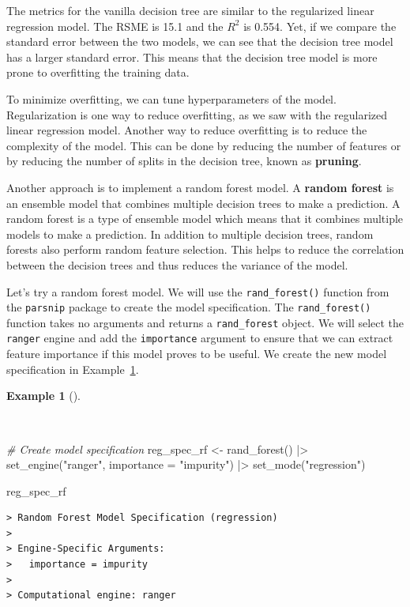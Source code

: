 \documentclass[
  letterpaper,
  DIV=11,
  numbers=noendperiod]{scrreprt}
\newenvironment{Shaded}{\begin{snugshade}}{\end{snugshade}}
\newcommand{\AttributeTok}[1]{\textcolor[rgb]{0.00,0.00,0.00}{#1}}
\newcommand{\CommentTok}[1]{\textcolor[rgb]{0.00,0.00,0.00}{\textit{#1}}}
\newcommand{\FunctionTok}[1]{\textcolor[rgb]{0.00,0.00,0.00}{#1}}
\newcommand{\NormalTok}[1]{\textcolor[rgb]{0.00,0.00,0.00}{#1}}
\newcommand{\OtherTok}[1]{\textcolor[rgb]{0.00,0.00,0.00}{#1}}
\newcommand{\SpecialCharTok}[1]{\textcolor[rgb]{0.00,0.00,0.00}{#1}}
\newcommand{\StringTok}[1]{\textcolor[rgb]{0.00,0.00,0.00}{#1}}
\theoremstyle{definition}
\newtheorem{example}{Example}[chapter]
\theoremstyle{remark}
\begin{document}
The metrics for the vanilla decision tree are similar to the regularized
linear regression model. The RSME is 15.1 and the \(R^2\) is 0.554. Yet,
if we compare the standard error between the two models, we can see that
the decision tree model has a larger standard error. This means that the
decision tree model is more prone to overfitting the training data.

To minimize overfitting, we can tune hyperparameters of the model.
Regularization is one way to reduce overfitting, as we saw with the
regularized linear regression model. Another way to reduce overfitting
is to reduce the complexity of the model. This can be done by reducing
the number of features or by reducing the number of splits in the
decision tree, known as \textbf{pruning}.

Another approach is to implement a random forest model. A \textbf{random
forest} is an ensemble model that combines multiple decision trees to
make a prediction. A random forest is a type of ensemble model which
means that it combines multiple models to make a prediction. In addition
to multiple decision trees, random forests also perform random feature
selection. This helps to reduce the correlation between the decision
trees and thus reduces the variance of the model.

Let's try a random forest model. We will use the \texttt{rand\_forest()}
function from the \texttt{parsnip} package to create the model
specification. The \texttt{rand\_forest()} function takes no arguments
and returns a \texttt{rand\_forest} object. We will select the
\texttt{ranger} engine and add the \texttt{importance} argument to
ensure that we can extract feature importance if this model proves to be
useful. We create the new model specification in
Example~\ref{exm-pda-reg-model-spec-random-forest}.

\begin{example}[]\protect\hypertarget{exm-pda-reg-model-spec-random-forest}{}\label{exm-pda-reg-model-spec-random-forest}

~

\begin{Shaded}
\begin{Highlighting}[]
\CommentTok{\# Create model specification}
\NormalTok{reg\_spec\_rf }\OtherTok{\textless{}{-}}
  \FunctionTok{rand\_forest}\NormalTok{() }\SpecialCharTok{|\textgreater{}}
  \FunctionTok{set\_engine}\NormalTok{(}\StringTok{"ranger"}\NormalTok{, }\AttributeTok{importance =} \StringTok{"impurity"}\NormalTok{) }\SpecialCharTok{|\textgreater{}}
  \FunctionTok{set\_mode}\NormalTok{(}\StringTok{"regression"}\NormalTok{)}

\NormalTok{reg\_spec\_rf}
\end{Highlighting}
\end{Shaded}

\begin{verbatim}
> Random Forest Model Specification (regression)
> 
> Engine-Specific Arguments:
>   importance = impurity
> 
> Computational engine: ranger
\end{verbatim}

\end{example}
\end{document}
